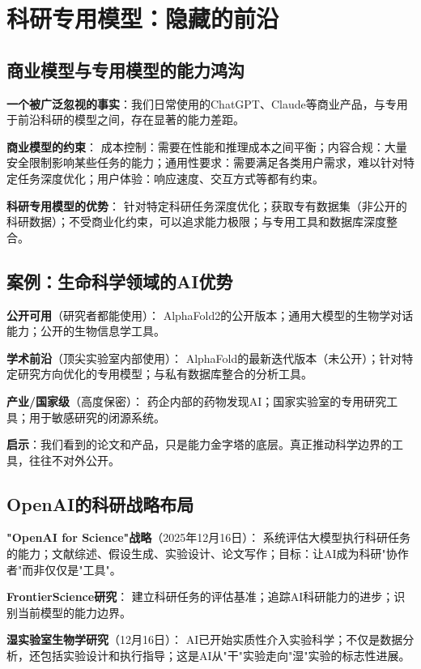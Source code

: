 \section{科研专用模型：隐藏的前沿}

\subsection{商业模型与专用模型的能力鸿沟}

\textbf{一个被广泛忽视的事实}：我们日常使用的ChatGPT、Claude等商业产品，与专用于前沿科研的模型之间，存在显著的能力差距。

\textbf{商业模型的约束}：
成本控制：需要在性能和推理成本之间平衡；内容合规：大量安全限制影响某些任务的能力；通用性要求：需要满足各类用户需求，难以针对特定任务深度优化；用户体验：响应速度、交互方式等都有约束。

\textbf{科研专用模型的优势}：
针对特定科研任务深度优化；获取专有数据集（非公开的科研数据）；不受商业化约束，可以追求能力极限；与专用工具和数据库深度整合。

\subsection{案例：生命科学领域的AI优势}

\textbf{公开可用}（研究者都能使用）：
AlphaFold2的公开版本；通用大模型的生物学对话能力；公开的生物信息学工具。

\textbf{学术前沿}（顶尖实验室内部使用）：
AlphaFold的最新迭代版本（未公开）；针对特定研究方向优化的专用模型；与私有数据库整合的分析工具。

\textbf{产业/国家级}（高度保密）：
药企内部的药物发现AI；国家实验室的专用研究工具；用于敏感研究的闭源系统。

\textbf{启示}：我们看到的论文和产品，只是能力金字塔的底层。真正推动科学边界的工具，往往不对外公开。

\subsection{OpenAI的科研战略布局}

\textbf{"OpenAI for Science"战略}（2025年12月16日）：
系统评估大模型执行科研任务的能力；文献综述、假设生成、实验设计、论文写作；目标：让AI成为科研"协作者"而非仅仅是"工具"。

\textbf{FrontierScience研究}：
建立科研任务的评估基准；追踪AI科研能力的进步；识别当前模型的能力边界。

\textbf{湿实验室生物学研究}（12月16日）：
AI已开始实质性介入实验科学；不仅是数据分析，还包括实验设计和执行指导；这是AI从"干"实验走向"湿"实验的标志性进展。

